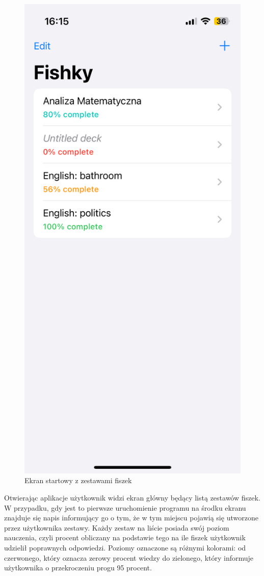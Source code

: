 \documentclass[final,a4paper,openany,12pt]{mwbk}
\begin{document}
\begin{figure}[H]
\begin{minipage}{0.5\textwidth}
  \includegraphics[width=.75\linewidth]{img/fishky2.PNG}
  \caption{Ekran startowy z zestawami fiszek}
  \label{fig:fishky2}
\end{minipage}
\end{figure}

Otwierając aplikacje użytkownik widzi ekran główny będący listą zestawów fiszek. W przypadku, gdy jest to pierwsze uruchomienie programu na środku ekranu znajduje się napis informujący go o tym, że w tym miejscu pojawią się utworzone przez użytkownika zestawy. Każdy zestaw na liście posiada swój poziom nauczenia, czyli procent obliczany na podstawie tego na ile fiszek użytkownik udzielił poprawnych odpowiedzi. Poziomy oznaczone są różnymi kolorami: od czerwonego, który oznacza zerowy procent wiedzy do zielonego, który informuje użytkownika o przekroczeniu progu 95 procent. 
\end{document}
